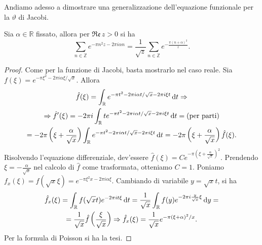Andiamo adesso a dimostrare una generalizzazione dell'equazione funzionale per la $\vartheta$ di Jacobi.

\begin{prop}
  Sia $\alpha \in \mathbb{R}$ fissato, allora per $\mathfrak{Re}\,z>0$ si ha
  $$\sum_{n \in \mathbb{Z}} e^{-\pi n^2z-2\pi i\alpha n}=\frac{1}{\sqrt{z}}\sum_{n \in \mathbb{Z}} e^{-\frac{\pi(n+\alpha)^2}{z}}.$$
\end{prop}

\begin{proof}
  Come per la funzione di Jacobi, basta mostrarlo nel caso reale. Sia $f(\xi)=e^{-\pi\xi^2-2\pi i\alpha\xi/\sqrt{x}}$. Allora
  \begin{gather*}
    \hat{f}(\xi)=\int_{\mathbb{R}} e^{-\pi t^2-2\pi i\alpha t/\sqrt{x}-2\pi i\xi t}\mathop{}\!\mathrm{d} t \Rightarrow \\
    \Rightarrow \hat{f}'(\xi)=-2\pi i\int_{\mathbb{R}} te^{-\pi t^2-2\pi i\alpha t/\sqrt{x}-2\pi i\xi t}\mathop{}\!\mathrm{d} t=\text{(per parti)}\\
    =-2\pi\left(\xi+\frac{\alpha}{\sqrt{x}}\right)\int_{\mathbb{R}} e^{-\pi t^2-2\pi i\alpha t/\sqrt{x}-2\pi i\xi t}\mathop{}\!\mathrm{d} t=-2\pi\left(\xi+\frac{\alpha}{\sqrt{x}}\right)\hat{f}(\xi).
  \end{gather*}
  Risolvendo l'equazione differenziale, dev'essere $\hat{f}(\xi)=Ce^{-\pi\left(\xi+\frac{\alpha}{\sqrt{x}}\right)^2}$. Prendendo $\xi=-\frac{\alpha}{\sqrt{x}}$ nel calcolo di $\hat{f}$ come trasformata, otteniamo $C=1$. Poniamo $f_x(\xi)=f(\sqrt{x}\xi)=e^{-\pi\xi^2x-2\pi i\alpha\xi}$. Cambiando di variabile $y=\sqrt{x}t$, si ha
  \begin{gather*}
    \hat{f}_x(\xi)=\int_{\mathbb{R}} f(\sqrt{x}t)e^{-2\pi it\xi}\mathop{}\!\mathrm{d} t=\frac{1}{\sqrt{x}} \int_{\mathbb{R}} f(y) e^{-2\pi i\frac{y}{\sqrt{x}}\xi}\mathop{}\!\mathrm{d} y=\\
    =\frac{1}{\sqrt{x}}\hat{f}\left(\frac{\xi}{\sqrt{x}}\right) \Rightarrow \hat{f}_x(\xi)=\frac{1}{\sqrt{x}}e^{-\pi(\xi+\alpha)^2/x}.
  \end{gather*}
  Per la formula di Poisson si ha la tesi.
\end{proof}
